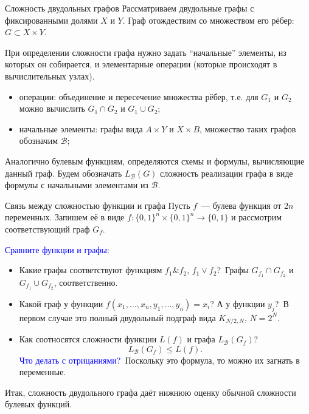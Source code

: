 \documentclass{beamer}
\renewcommand\le{\leqslant}
\begin{document}
\begin{frame}{Сложность двудольных графов}
    Рассматриваем двудольные графы с фиксированными долями $X$ и $Y$. Граф
    отождествим со множеством его рёбер: $G\subset X\times Y$.
    \pause\vspace{5pt}

    При определении сложности графа нужно задать ``начальные'' элементы, из
    которых он собирается, и элементарные операции (которые происходят в
    вычислительных узлах).
    \pause\vspace{5pt}

    \begin{itemize}
        \item операции: объединение и пересечение множества рёбер, т.е. для
            $G_1$ и $G_2$ можно вычислить $G_1\cap G_2$ и $G_1\cup G_2$;
        \item начальные элементы: графы вида $A\times Y$ и $X\times B$,
            множество таких графов обозначим $\mathcal B$;
    \end{itemize}
    \pause\vspace{5pt}

    Аналогично булевым функциям, определяются схемы и формулы, вычисляющие
    данный граф. Будем обозначать $L_{\mathcal B}(G)$ сложность реализации графа в виде
    формулы с начальными элементами из $\mathcal B$.

\end{frame}

\begin{frame}{Связь между сложностью функции и графа}
    Пусть $f$~--- булева функция от
    $2n$ переменных. Запишем её в виде $f\colon\{0,1\}^n\times\{0,1\}^n\to
    \{0,1\}$ и рассмотрим соответствующий граф $G_f$.
    \pause\vspace{5pt}

    \textcolor{blue}{Сравните функции и графы:}
    \begin{itemize}
        \item Какие графы соответствуют функциям $f_1\& f_2$, $f_1\vee
            f_2$?\pause~Графы $G_{f_1}\cap G_{f_2}$ и $G_{f_1}\cup G_{f_2}$,
            соответственно.\pause
        \item Какой граф у функции $f(x_1,\ldots,x_n,y_1,\ldots,y_n)=x_i$? А у
            функции $y_j$?\pause~В первом случае это полный двудольный подграф
            вида $K_{N/2,N}$, $N=2^N$.\pause
        \item Как соотносятся сложности функции $L(f)$ и графа $L_{\mathcal
            B}(G_f)$?\pause
            $$
            L_{\mathcal B}(G_f) \le L(f).
            $$
            \textcolor{blue}{Что делать с отрицаниями?}\pause~Поскольку это
            формула, то можно их загнать в переменные.
    \end{itemize}

    Итак, сложность двудольного графа даёт нижнюю оценку обычной 
    сложности булевых функций.
\end{frame}
\end{document}
